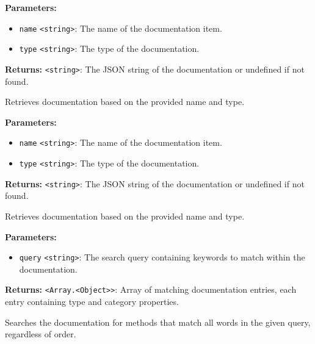 \documentclass[12pt,a4paper]{article}
\begin{document}
\noindent \textbf{Parameters:}
\begin{itemize}
  \item \texttt{name} \texttt{<string>}: The name of the documentation item.
  \item \texttt{type} \texttt{<string>}: The type of the documentation.
\end{itemize}

\noindent \textbf{Returns:} \texttt{<string>}: The JSON string of the documentation or undefined if not found.

\noindent Retrieves documentation based on the provided name and type.

\vspace{5mm}
\noindent {}


\noindent \textbf{Parameters:}
\begin{itemize}
  \item \texttt{name} \texttt{<string>}: The name of the documentation item.
  \item \texttt{type} \texttt{<string>}: The type of the documentation.
\end{itemize}

\noindent \textbf{Returns:} \texttt{<string>}: The JSON string of the documentation or undefined if not found.

\noindent Retrieves documentation based on the provided name and type.

\vspace{5mm}
\noindent {}


\noindent \textbf{Parameters:}
\begin{itemize}
  \item \texttt{query} \texttt{<string>}: The search query containing keywords to match within the documentation.
\end{itemize}

\noindent \textbf{Returns:} \texttt{<Array.<Object>>}: Array of matching documentation entries, each entry containing \textasciigrave{}type\textasciigrave{} and \textasciigrave{}category\textasciigrave{} properties.

\noindent Searches the documentation for methods that match all words in the given query, regardless of order.
\end{document}
